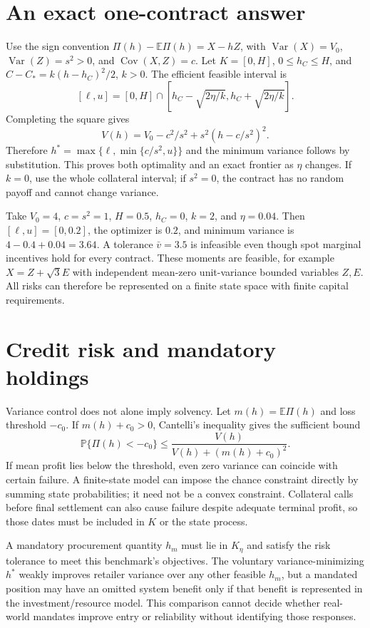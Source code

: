 \documentclass[11pt]{article}
\newcommand{\E}{\mathbb E}
\newcommand{\Prb}{\mathbb P}
\newcommand{\Var}{\operatorname{Var}}
\newcommand{\Cov}{\operatorname{Cov}}
\begin{document}
\section*{An exact one-contract answer}
Use the sign convention $\Pi(h)-\E\Pi(h)=X-hZ$, with $\Var(X)=V_0$, $\Var(Z)=s^2>0$, and $\Cov(X,Z)=c$. Let $K=[0,H]$, $0\leq h_C\leq H$, and $C-C_*=k(h-h_C)^2/2$, $k>0$. The efficient feasible interval is
\[
 [\ell,u]=[0,H]\cap
 [h_C-\sqrt{2\eta/k},h_C+\sqrt{2\eta/k}].
\]
Completing the square gives
\[
 V(h)=V_0-c^2/s^2+s^2(h-c/s^2)^2.
\]
Therefore $h^*=\max\{\ell,\min\{c/s^2,u\}\}$ and the minimum variance follows by substitution. This proves both optimality and an exact frontier as $\eta$ changes. If $k=0$, use the whole collateral interval; if $s^2=0$, the contract has no random payoff and cannot change variance.

Take $V_0=4$, $c=s^2=1$, $H=0.5$, $h_C=0$, $k=2$, and $\eta=0.04$. Then $[\ell,u]=[0,0.2]$, the optimizer is $0.2$, and minimum variance is $4-0.4+0.04=3.64$. A tolerance $\bar v=3.5$ is infeasible even though spot marginal incentives hold for every contract. These moments are feasible, for example $X=Z+\sqrt3E$ with independent mean-zero unit-variance bounded variables $Z,E$. All risks can therefore be represented on a finite state space with finite capital requirements.

\section*{Credit risk and mandatory holdings}
Variance control does not alone imply solvency. Let $m(h)=\E\Pi(h)$ and loss threshold $-c_0$. If $m(h)+c_0>0$, Cantelli's inequality gives the sufficient bound
\[
 \Prb\{\Pi(h)<-c_0\}
 \leq\frac{V(h)}{V(h)+(m(h)+c_0)^2}.
\]
If mean profit lies below the threshold, even zero variance can coincide with certain failure. A finite-state model can impose the chance constraint directly by summing state probabilities; it need not be a convex constraint. Collateral calls before final settlement can also cause failure despite adequate terminal profit, so those dates must be included in $K$ or the state process.

A mandatory procurement quantity $h_m$ must lie in $K_\eta$ and satisfy the risk tolerance to meet this benchmark's objectives. The voluntary variance-minimizing $h^*$ weakly improves retailer variance over any other feasible $h_m$, but a mandated position may have an omitted system benefit only if that benefit is represented in the investment/resource model. This comparison cannot decide whether real-world mandates improve entry or reliability without identifying those responses.
\end{document}
